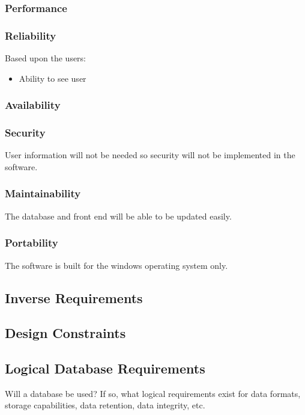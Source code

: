 \documentclass[titlepage]{article}
\begin{document}
\subsubsection{Performance}

\subsubsection{Reliability}
Based upon the users:
\begin{itemize}
	\item Ability to see user 
\end{itemize}

\subsubsection{Availability}


\subsubsection{Security}
User information will not be needed so security will not be implemented in the software. 

\subsubsection{Maintainability}
The database and front end will be able to be updated easily. 

\subsubsection{Portability}
The software is built for the windows operating system only. 

\subsection{Inverse Requirements}

\subsection{Design Constraints}


\subsection{Logical Database Requirements}
Will a database be used?  If so, what logical requirements exist for data formats, storage capabilities, data retention, data integrity, etc.
\end{document}
